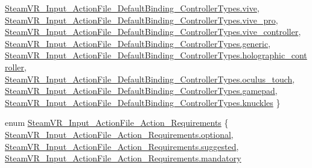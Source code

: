 \begin{DoxyCompactItemize}
\mbox{\hyperlink{namespace_valve_1_1_v_r_a040b1a3a09cfc50936767d92db7cae61a89cb77e3a49bde605a37afcd87508e16}{Steam\+V\+R\+\_\+\+Input\+\_\+\+Action\+File\+\_\+\+Default\+Binding\+\_\+\+Controller\+Types.\+vive}}, 
\mbox{\hyperlink{namespace_valve_1_1_v_r_a040b1a3a09cfc50936767d92db7cae61afe60c904133a3b61f8418e7e3aa5b82f}{Steam\+V\+R\+\_\+\+Input\+\_\+\+Action\+File\+\_\+\+Default\+Binding\+\_\+\+Controller\+Types.\+vive\+\_\+pro}}, 
\mbox{\hyperlink{namespace_valve_1_1_v_r_a040b1a3a09cfc50936767d92db7cae61ae644fc19e7eace843bc3a8aa25882fa8}{Steam\+V\+R\+\_\+\+Input\+\_\+\+Action\+File\+\_\+\+Default\+Binding\+\_\+\+Controller\+Types.\+vive\+\_\+controller}}, 
\mbox{\hyperlink{namespace_valve_1_1_v_r_a040b1a3a09cfc50936767d92db7cae61a3d517f8924ac7fd03699a29d97dc52d9}{Steam\+V\+R\+\_\+\+Input\+\_\+\+Action\+File\+\_\+\+Default\+Binding\+\_\+\+Controller\+Types.\+generic}}, 
\newline
\mbox{\hyperlink{namespace_valve_1_1_v_r_a040b1a3a09cfc50936767d92db7cae61aac4e3438bd4725bf54997c01254d5568}{Steam\+V\+R\+\_\+\+Input\+\_\+\+Action\+File\+\_\+\+Default\+Binding\+\_\+\+Controller\+Types.\+holographic\+\_\+controller}}, 
\mbox{\hyperlink{namespace_valve_1_1_v_r_a040b1a3a09cfc50936767d92db7cae61af4f09dcded396dbe3d0eacfddb11b205}{Steam\+V\+R\+\_\+\+Input\+\_\+\+Action\+File\+\_\+\+Default\+Binding\+\_\+\+Controller\+Types.\+oculus\+\_\+touch}}, 
\mbox{\hyperlink{namespace_valve_1_1_v_r_a040b1a3a09cfc50936767d92db7cae61acbba9c7337cee922a53c56866814bc17}{Steam\+V\+R\+\_\+\+Input\+\_\+\+Action\+File\+\_\+\+Default\+Binding\+\_\+\+Controller\+Types.\+gamepad}}, 
\mbox{\hyperlink{namespace_valve_1_1_v_r_a040b1a3a09cfc50936767d92db7cae61ac726698620762d88f738be4a294fae79}{Steam\+V\+R\+\_\+\+Input\+\_\+\+Action\+File\+\_\+\+Default\+Binding\+\_\+\+Controller\+Types.\+knuckles}}
 \}
\item 
enum \mbox{\hyperlink{namespace_valve_1_1_v_r_aad5d315b08bb9488c260d7228a1337e6}{Steam\+V\+R\+\_\+\+Input\+\_\+\+Action\+File\+\_\+\+Action\+\_\+\+Requirements}} \{ \mbox{\hyperlink{namespace_valve_1_1_v_r_aad5d315b08bb9488c260d7228a1337e6ad57c24f3fe52d16e7169b912dd647f0d}{Steam\+V\+R\+\_\+\+Input\+\_\+\+Action\+File\+\_\+\+Action\+\_\+\+Requirements.\+optional}}, 
\mbox{\hyperlink{namespace_valve_1_1_v_r_aad5d315b08bb9488c260d7228a1337e6ac30635cc93c51c6f6731806dbd149a51}{Steam\+V\+R\+\_\+\+Input\+\_\+\+Action\+File\+\_\+\+Action\+\_\+\+Requirements.\+suggested}}, 
\mbox{\hyperlink{namespace_valve_1_1_v_r_aad5d315b08bb9488c260d7228a1337e6ac5e3b9675d114c21ad3367d318f6aa95}{Steam\+V\+R\+\_\+\+Input\+\_\+\+Action\+File\+\_\+\+Action\+\_\+\+Requirements.\+mandatory}}

\end{DoxyCompactItemize}
